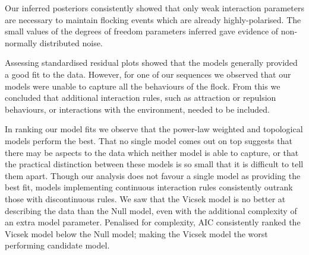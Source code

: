 Our inferred posteriors consistently showed that only weak interaction
parameters are necessary to maintain flocking events which are already
highly-polarised. The small values of the degrees of freedom parameters
inferred gave evidence of non-normally distributed noise.

Assessing standardised residual plots showed that the models generally
provided a good fit to the data. However, for one of our sequences we
observed that our models were unable to capture all the behaviours of the
flock. From this we concluded that additional interaction rules, such as
attraction or repulsion behaviours, or interactions with the environment,
needed to be included.

In ranking our model fits we observe that the power-law weighted and
topological models perform the best. That no single model comes out on top
suggests that there may be aspects to the data which neither model is able to
capture, or that the practical distinction between these models is so small
that it is difficult to tell them apart. Though our analysis does not favour a
single model as providing the best fit, models implementing continuous
interaction rules consistently outrank those with discontinuous rules. We saw
that the Vicsek model is no better at describing the data than the Null model,
even with the additional complexity of an extra model parameter. Penalised for
complexity, AIC consistently ranked the Vicsek model below the Null model;
making the Vicsek model the worst performing candidate model.

